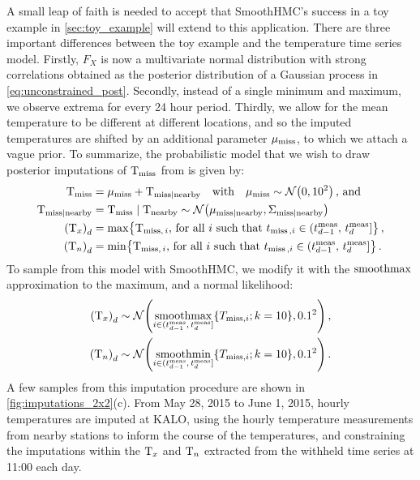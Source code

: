 \documentclass[12pt]{article}
\begin{document}
A small leap of faith is needed to accept that SmoothHMC's success in a toy example in \autoref{sec:toy_example} will extend to this application.
There are three important differences between the toy example and the temperature time series model.
Firstly, \(F_X\) is now a multivariate normal distribution with strong correlations obtained as the posterior distribution of a Gaussian process in \autoref{eq:unconstrained_post}.
Secondly, instead of a single minimum and maximum, we observe extrema for every 24 hour period.
Thirdly, we allow for the mean temperature to be different at different locations,
and so the imputed temperatures are shifted by an additional parameter \(\mu_{\mathrm{miss}}\),
to which we attach a vague prior.
To summarize, the probabilistic model that we wish to draw posterior imputations of \(\mathrm{T}_{\mathrm{miss}}\) from is given by:
\begin{equation}
\begin{split}
    \T_\miss &= \mu_\miss + \T_{\miss \mid \obs} 
        \quad\text{with}\quad 
        \mu_{\miss} \sim \normal\del{0,10^2}
    \,\text{, and} \\
    \T_{\miss \mid \obs} &= \T_{\miss} \mid \T_\obs \sim \normal\del{\mu_{\miss \mid \obs}, \Sigma_{\miss \mid \obs}}\, \\
    \del{\Tx}_{\iday} &= \max\cbr{\T_{\miss,\,i}\text{, for all \(i\) such that } t_{\miss\,,i} \in \dayset{\iday}} \,,\\
    \del{\Tn}_{\iday} &= \min\cbr{\T_{\miss,\,i}\text{, for all \(i\) such that } t_{\miss\,,i} \in \dayset{\iday}} \,.
\end{split}
\label{eq:idealmodel}
\end{equation}
To sample from this model with SmoothHMC, we modify it with the \(\operatorname*{smoothmax}\) approximation to the maximum, and a normal likelihood:
\begin{equation}
\begin{split}
    \del{\Tx}_{\iday} &\sim \normal\del{\softmax_{i \in \dayset{\iday}} \cbr{ T_{\miss,i}; k=10}, 0.1^2}\,, \\
    \del{\Tn}_{\iday} &\sim \normal\del{\softmin_{i \in \dayset{\iday}} \cbr{ T_{\miss,i}; k=10}, 0.1^2}\,.
\end{split}
\label{eq:smoothed_model}
\end{equation}
A few samples from this imputation procedure are shown in \autoref{fig:imputations_2x2}(c).
From May 28, 2015 to June 1, 2015, hourly temperatures are imputed at KALO, using the hourly temperature measurements from nearby stations to inform the course of the temperatures, and constraining the imputations within the \(\mathrm{T}_{x}\) and \(\mathrm{T}_{n}\) extracted from the withheld time series at 11:00 each day.
\end{document}
